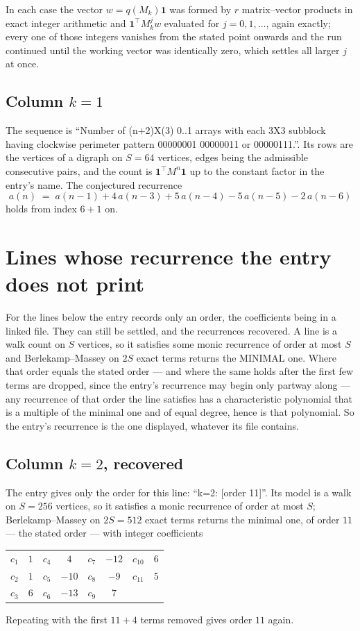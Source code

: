 \documentclass[11pt,a4paper]{article}
\theoremstyle{plain}
\theoremstyle{definition}
\begin{document}
In each case the vector $w=q(M_k)\mathbf{1}$ was formed by $r$ matrix--vector products in
exact integer arithmetic and $\mathbf{1}^{\!\top}M_k^{j}w$ evaluated for $j=0,1,\dots$,
again exactly; every one of those integers vanishes from the stated point onwards and the run
continued until the working vector was identically zero, which settles all larger $j$ at once.

\subsection*{Column $k$$=1$}
The sequence is ``Number of (n+2)X(3) 0..1 arrays with each 3X3 subblock having clockwise perimeter pattern 00000001 00000011 or 00000111.''. Its rows are the vertices of a digraph on
$S=64$ vertices, edges being the admissible consecutive pairs, and the count is
$\mathbf{1}^{\!\top}M^{n}\mathbf{1}$ up to the constant factor in the entry's name.
The conjectured recurrence
\[
a(n)\;=\;a(n-1) + 4\,a(n-3) + 5\,a(n-4) - 5\,a(n-5) - 2\,a(n-6)
\]
holds from index $6+1$ on.


\section{Lines whose recurrence the entry does not print}

For the lines below the entry records only an order, the coefficients being in a linked file.
They can still be settled, and the recurrences recovered. A line is a walk count on $S$
vertices, so it satisfies some monic recurrence of order at most $S$ and Berlekamp--Massey on
$2S$ exact terms returns the MINIMAL one. Where that order equals the stated order --- and
where the same holds after the first few terms are dropped, since the entry's recurrence may
begin only partway along --- any recurrence of that order the line satisfies has a
characteristic polynomial that is a multiple of the minimal one and of equal degree, hence is
that polynomial. So the entry's recurrence is the one displayed, whatever its file contains.

\subsection*{Column $k=2$, recovered}
The entry gives only the order for this line: ``k=2: [order 11]''. Its model is a walk on
$S=256$ vertices, so it satisfies a monic recurrence of order at most $S$;
Berlekamp--Massey on $2S=512$ exact terms returns the minimal one, of order
$11$ --- the stated order --- with integer coefficients
\begin{center}\small\begin{tabular}{cccccccc}
$c_{1}$ & $1$ & $c_{4}$ & $4$ & $c_{7}$ & $-12$ & $c_{10}$ & $6$ \\
$c_{2}$ & $1$ & $c_{5}$ & $-10$ & $c_{8}$ & $-9$ & $c_{11}$ & $5$ \\
$c_{3}$ & $6$ & $c_{6}$ & $-13$ & $c_{9}$ & $7$ &  &  \\
\end{tabular}\end{center}
Repeating with the first $11+4$ terms removed gives order $11$ again.
\end{document}
